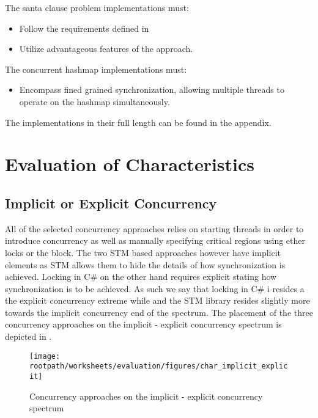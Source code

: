 The santa clause problem implementations must:
\begin{itemize}
	\item Follow the requirements defined in \cite{trono1994new}
	\item Utilize advantageous features of the approach.
\end{itemize}

The concurrent hashmap implementations must:
\begin{itemize}
	\item Encompass fined grained synchronization, allowing multiple threads to operate on the hashmap simultaneously.
\end{itemize}
The implementations in their full length can be found in the appendix.

\section{Evaluation of Characteristics}
\subsection{Implicit or Explicit Concurrency}
All of the selected concurrency approaches relies on starting threads in order to introduce concurrency as well as manually specifying critical regions using ether locks or the  block. The two \ac{STM} based approaches however have implicit elements as \ac{STM} allows them to hide the details of how synchronization is achieved. Locking in C\# on the other hand requires explicit stating how synchronization is to be achieved. As such we say that locking in C\# i resides a the explicit concurrency extreme while \stmnamesp and the \ac{STM} library resides slightly more towards the implicit concurrency end of the spectrum. The placement of the three concurrency approaches on the implicit - explicit concurrency spectrum is depicted in .

\begin{figure}[htbp]
\centering
 \texttt{[image: \\rootpath/worksheets/evaluation/figures/char\_implicit\_explicit]} 
 \caption{Concurrency approaches on the implicit - explicit concurrency spectrum}
\label{fig:char_implicit_explicit}
\end{figure}

